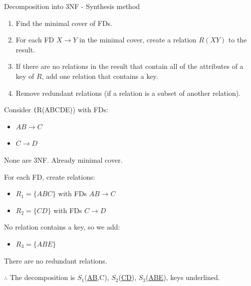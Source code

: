 \begin{theorem}
    {Decomposition into 3NF - Synthesis method}

    \begin{enumerate}
        \item Find the minimal cover of FDs.
        \item For each FD $X \to Y$ in the minimal cover, create a relation $R(XY)$ to the result.
        \item If there are no relations in the result that contain all of the attributes of a key of $R$, add one relation that contains a key.
        \item Remove redundant relations (if a relation is a subset of another relation).
    \end{enumerate}

    \tcblower

    Consider \texttt(R(ABCDE)) with FDs:
    \begin{itemize}
        \item $AB \to C$
        \item $C \to D$
    \end{itemize}

    None are 3NF. Already minimal cover.

    For each FD, create relations:
    \begin{itemize}
        \item $R_1 = \{ABC\}$ with FDs $AB \to C$
        \item $R_2 = \{CD\}$ with FDs $C \to D$
    \end{itemize}
    No relation contains a key, so we add:
    \begin{itemize}
        \item $R_3 = \{ABE\}$
    \end{itemize}

    There are no redundant relations.

    $\therefore$ The decomposition is $S_1$(\underline{AB},C), $S_2$(\underline{CD}), $S_3$(\underline{ABE}), keys underlined.
\end{theorem}